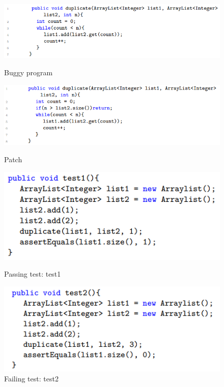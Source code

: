 \begin{figure}[htbp]
	\centering
	\begin{minipage}[t]{1\textwidth}
		\centering
		\includegraphics[width=1\textwidth]{fig1.png}
		\caption{Buggy program}\label{fig1}
		\vspace{5mm}
	\end{minipage}
	
	\begin{minipage}[t]{1\textwidth}
		\centering
		\includegraphics[width=1\textwidth]{fig2.png}
		\caption{Patch}\label{fig2}
		\vspace{5mm}
	\end{minipage}
	
	\begin{minipage}[t]{0.5\textwidth}
		\centering
		\includegraphics[width=1\textwidth]{fig3.png}
		\caption{Passing test: test1}\label{fig3}
	\end{minipage}
	\begin{minipage}[t]{0.48\textwidth}
		\centering
		\includegraphics[width=1\textwidth]{fig4.png}
		\caption{Failing test: test2}\label{fig4}
	\end{minipage}
\end{figure}

